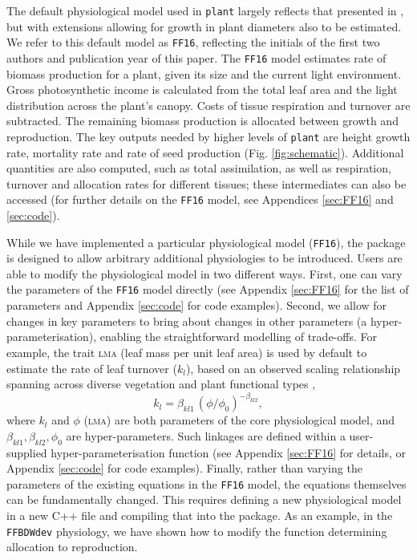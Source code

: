 \documentclass[a4paper,11pt]{article}
\newcommand{\plant}{\texttt{plant}}
\begin{document}
The default physiological model used in {\plant} largely reflects
that presented in \citet{Falster-2011, Falster-2015}, but with extensions
allowing for growth in plant diameters also to be estimated. We refer to this
default model as \texttt{FF16}, reflecting the initials of the first two authors
and publication year of this paper. The \texttt{FF16} model estimates rate
of biomass
production for a plant, given its size and the current light
environment. Gross photosynthetic income is calculated from the total
leaf area and the light distribution across the plant's canopy. Costs
of tissue respiration and turnover are subtracted. The remaining
biomass production is allocated between growth and reproduction. The key
outputs needed by higher levels of {\plant} are height
growth rate, mortality rate and rate of seed production (Fig. \ref{fig:schematic}). Additional quantities are also computed, such as total assimilation, as well as
respiration, turnover and allocation rates for different
tissues; these intermediates can also be accessed (for further details on the \texttt{FF16} model, see Appendices
\ref{sec:FF16} and \ref{sec:code}).

While we have implemented a particular physiological model
(\texttt{FF16}), the package is designed to allow arbitrary
additional physiologies to be introduced. Users are able to modify the
physiological model in two different ways. First, one can vary the
parameters of the \texttt{FF16} model directly (see Appendix
\ref{sec:FF16} for the list of parameters and Appendix \ref{sec:code} for code
examples). Second, we allow for changes in key parameters to bring
about changes in other parameters (a hyper-parameterisation), enabling the
straightforward modelling of trade-offs. For example, the
trait \textsc{lma} (leaf mass per unit leaf area) is used by default to estimate
the rate of leaf turnover ($k_l$), based on an observed scaling
relationship spanning across diverse vegetation and plant functional
types \citep{Wright-2004},
$$k_l = \beta_{kl1} \, \left(\phi / \phi_0\right)^{-\beta_{kl2}},$$
where $k_l$ and $\phi$ (\textsc{lma}) are both parameters of the core physiological
model, and $\beta_{kl1}, \beta_{kl2}, \phi_0$ are hyper-parameters. Such
linkages are defined within a user-supplied hyper-parameterisation function
(see Appendix \ref{sec:FF16} for details, or Appendix
\ref{sec:code} for code examples).
%
Finally, rather than varying the parameters of the existing equations
in the \texttt{FF16} model, the equations themselves can be
fundamentally changed. This requires defining a new physiological
model in a new C++ file and compiling that into the package. As an
example, in the \texttt{FFBDWdev} physiology, we have shown how to modify the
function determining allocation to reproduction.
\end{document}
